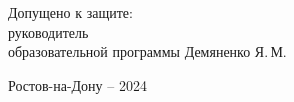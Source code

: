 \begin{singlespacing}
\begin{center}
\noindent
\begin{flushleft}
Допущено к защите:\\
руководитель \\
образовательной программы \underline{\hspace*{60mm}} Демяненко Я.\,М.
\end{flushleft}




\vfill
Ростов-на-Дону -- 2024

\end{center} 

\singlespacing
\end{singlespacing}